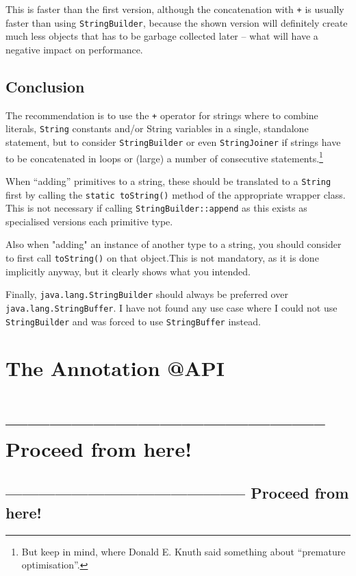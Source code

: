 \documentclass[11pt,a4paper, titlepage, parskip=half, headsepline, footsepline, cleardoublepage=current, headheight=1cm]{scrbook}
\begin{document}
This is faster than the first version, although the concatenation with \verb#+# is usually faster than using \lstinline|StringBuilder|, because the shown version will definitely create much less objects that has to be garbage collected later – what will have a negative impact on performance.

\subsection{Conclusion}
The recommendation is to use the \verb#+# operator for strings where to combine literals, \lstinline|String| constants and/or String variables in a single, standalone statement, but to consider \lstinline|StringBuilder| or even \lstinline|StringJoiner| if strings have to be concatenated in loops or (large) a number of consecutive statements.\footnote{But keep \autocite{Knuth:PrematureOptimization} in mind, where Donald E. Knuth said something about “premature optimisation”.}

When “adding” primitives to a string, these should be translated to a \lstinline|String| first by calling the \lstinline|static toString()| method of the appropriate wrapper class. This is not necessary if calling \lstinline|StringBuilder::append| as this exists as specialised versions each primitive type.

Also when "adding" an instance of another type to a string, you should consider to first call \lstinline|toString()| on that object.This is not mandatory, as it is done implicitly anyway, but it clearly shows what you intended.

Finally, \lstinline|java.lang.StringBuilder| should always be preferred over \lstinline|java.lang.StringBuffer|. I have not found any use case where I could not use \lstinline|StringBuilder| and was forced to use \lstinline|StringBuffer| instead.

\section{The Annotation @API}\label{sec:APIAnnotation}
\section{-------------------------------------------- Proceed from here!}
\subsection{-------------------------------------------- Proceed from here!}
\end{document}
